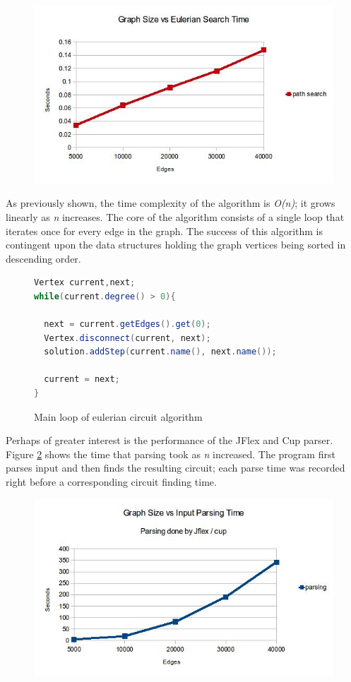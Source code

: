 \documentclass[journal]{IEEEtran}
\begin{document}
\begin{figure}[h]
\includegraphics[width=.5\textwidth]{images/path.jpg}
\caption{}
\label{fig:path}
\end{figure}

As previously shown, the time complexity of the algorithm is \textit{O(n)}; it grows linearly as \textit{n} increases. The core of the algorithm consists of a single loop that iterates once for every edge in the graph. The success of this algorithm is contingent upon the data structures holding the graph vertices being sorted in descending order.

\begin{figure}[h]
\begin{lstlisting}[language=java, 
 basicstyle=\footnotesize,  keywordstyle=\textbf]
Vertex current,next;
while(current.degree() > 0){

  next = current.getEdges().get(0);
  Vertex.disconnect(current, next);
  solution.addStep(current.name(), next.name());
  
  current = next;
}
\end{lstlisting}
\caption{Main loop of eulerian circuit algorithm}
\end{figure}

Perhaps of greater interest is the performance of the JFlex and Cup parser. Figure \ref{fig:parse} shows the time that parsing took as \textit{n} increased. The program first parses input and then finds the resulting circuit; each parse time was recorded right before a corresponding circuit finding time.

\begin{figure}[h]
\includegraphics[width=.5\textwidth]{images/parse.jpg}
\caption{}
\label{fig:parse}
\end{figure}
\end{document}
